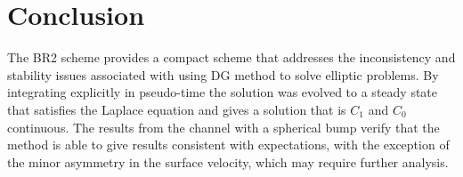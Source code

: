 \documentclass[a4paper]{article}
\begin{document}
\section{Conclusion}
The BR2 scheme provides a compact scheme that addresses the inconsistency and
stability issues associated with using DG method to solve elliptic problems.  By
integrating explicitly in pseudo-time the solution was evolved to a steady state
that satisfies the Laplace equation and gives a solution that is $C_1$ and $C_0$
continuous.  The results from the channel with a spherical bump verify that the
method is able to give results consistent with expectations, with the exception
of the minor asymmetry in the surface velocity, which may require further
analysis.



\end{document}
